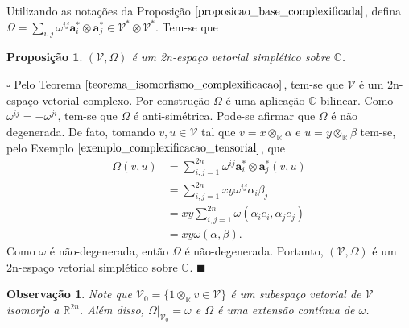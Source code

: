 \documentclass[12pt]{book}
\newtheorem{observacao}[teorema]{Observação}
\newtheorem{proposicao}[teorema]{Proposição}
\newenvironment{prova}[1]{$\square$ #1}{\hfill$\blacksquare$}
\newcommand{\complexificado}[1]{\mathcal{#1}}
\newcommand{\complexificacaoelemento}[2]{#1\otimes_{\reta} #2}
\newcommand{\complexo}[1]{\mathbb{C}^{#1}}
\newcommand{\formaSimpletica}[2]{\omega(#1, #2)}
\newcommand{\produtotensorialabrev}[2]{#1\otimes #2}
\newcommand{\produtotensorialdual}{\produtotensorialabrev{\complexificado{V}^{*}}{\complexificado{V}^{*}}}
\newcommand{\real}[1]{\mathbb{R}^{#1}}
\newcommand{\reta}{\real{}}
\begin{document}
	Utilizando as notações da Proposição $\ref{proposicao_base_complexificada}$, defina $\Omega=\sum_{i,j}\omega^{ij}\textbf{a}^{*}_{i}\otimes \textbf{a}^{*}_{j} \in \produtotensorialdual$. Tem-se que
	
	\begin{proposicao} $(\complexificado{V}, \Omega)$ é um 2n-espaço vetorial simplético sobre $\complexo{}$.
	\end{proposicao}\label{proposicao_complexificacao_espaco_simpletico}
	\begin{prova}
		Pelo Teorema $\ref{teorema_isomorfismo_complexificacao}$, tem-se que $\complexificado{V}$ é um 2n-espaço vetorial complexo. Por construção $\Omega$ é uma aplicação $\complexo{}$-bilinear. Como $\omega^{ij}  = -\omega^{ji} $, tem-se que $\Omega$ é anti-simétrica. Pode-se afirmar que $\Omega$ é não degenerada. De fato, tomando $v, u \in \complexificado{V}$ tal que $v= \complexificacaoelemento{x}{\alpha}$ e $u=\complexificacaoelemento{y}{\beta} $ tem-se, pelo Exemplo $\ref{exemplo_complexificacao_tensorial}$, que 
		$$
		\begin{aligned}
		\Omega(v,u) &= \sum_{i,j = 1}^{2n}
		\omega^{ij}\textbf{a}^{*}_{i}\otimes \textbf{a}^{*}_{j}(v,u)
		\\
		&= \sum_{i,j = 1}^{2n}
		xy\omega^{ij}\alpha_{i}\beta_{j}
		\\
		&= xy\sum_{i,j = 1}^{2n}
		\formaSimpletica{\alpha_{i}e_{i}}{\alpha_{j}e_{j}}
		\\
		&= xy\formaSimpletica{\alpha}{\beta}.
		\end{aligned}
		$$
		Como $\omega$ é não-degenerada, então $\Omega$ é não-degenerada. Portanto, $(\complexificado{V}, \Omega)$ é um 2n-espaço vetorial simplético sobre $\complexo{}$.
	\end{prova}
	
	\begin{observacao}
		Note que $\complexificado{V}_{0} = \{\complexificacaoelemento{1}{v} \in \complexificado{V} \}$ é um subespaço vetorial de $\complexificado{V}$ isomorfo a $\real{2n}$. Além disso, $\Omega|_{\complexificado{V}_{0}} = \omega$ e $\Omega$ é uma extensão contínua de $\omega$.
	\end{observacao}
	
\end{document}

